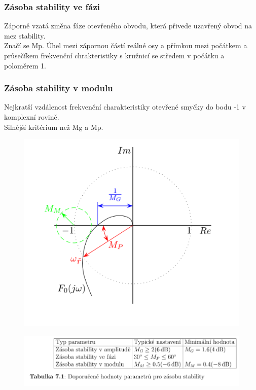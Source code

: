 \subsubsection*{Zásoba stability ve fázi}
Záporně vzatá změna fáze otevřeného obvodu, která přivede uzavřený obvod na mez stability.\\
Značí se Mp. Úhel mezi zápornou částí reálné osy a přímkou mezi počátkem a průsečíkem frekvenční chrakteristiky s kružnicí se středem v počátku a poloměrem 1.\\

\subsubsection*{Zásoba stability v modulu}
Nejkratší vzdálenost frekvenční charakteristiky otevřené smyčky do bodu -1 v komplexní rovině.\\
Silnější kritérium než Mg a Mp.\\

\begin{figure}[H]
    \centering
    \includegraphics*[scale = 1.2]{images/zasobaStabiliity.png}
\end{figure}
\begin{figure}[H]
    \includegraphics*[scale = 1.1]{images/zasobaStabiliityTabulka.png}
\end{figure}


